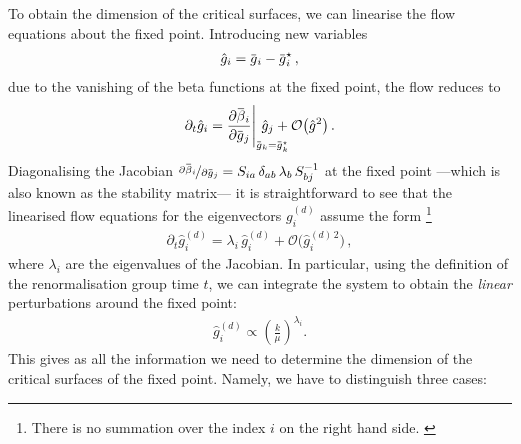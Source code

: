 \documentclass[11pt]{book}
\newcommand{\overbar}[1]{\mkern 1.5mu\overline{\mkern-1.5mu#1\mkern-1.5mu}\mkern 1.5mu}
\numberwithin{equation}{chapter}
\begin{document}
To obtain the dimension of the critical surfaces,
we can linearise the flow equations about
the fixed point. Introducing new variables
\begin{align}
  \hat g_i = \overbar g_i - \overbar g_i^\star \,,
\end{align}
due to the vanishing of the beta functions at
the fixed point, the flow reduces to
\begin{align}
  \partial_t \hat g_i =
  \frac{ \partial \overbar \beta_i }{ \partial \overbar g_j}
  \Bigg|_{ \overbar g_k = \overbar g_k^\star }
  \hspace{-7mm}
  \hat g_j
  + \mathcal O \big( \hat g^2 \big) \,.
\end{align}
Diagonalising the Jacobian
$\nicefrac{ \partial \overbar \beta_i }{ \partial \overbar g_j}
= S_{ia} \, \delta_{ab} \, \lambda_b \, S^{-1}_{bj}$
at the fixed point%
---which is also known as the stability matrix---%
it is straightforward to see that the linearised
flow equations for the eigenvectors
$g_i^{\scriptscriptstyle{(d)}}$
assume the form%
\footnote{
  There is no summation over the index $i$ on the right hand side.
  \label{foot:nosum}
}
\begin{align}
  \partial_t \hat g_i^{\scriptscriptstyle{(d)}} =
  \lambda_i \,
  \hat g_i^{\scriptscriptstyle{(d)}}
  + \mathcal O \big( \hat g_i^{\scriptscriptstyle{(d)} \, 2} \big) \,,
\end{align}
where $\lambda_i$ are the eigenvalues of the Jacobian.
In particular, using the definition of the renormalisation
group time $t$, we can integrate the system to obtain
the \textit{linear} perturbations around the fixed point:
\begin{align}
  \hat g_i^{\scriptscriptstyle{(d)}} \propto \left( \frac{k}{\mu} \right) ^{\lambda_i} .
\end{align}
This gives as all the information we need to determine
the dimension of the critical surfaces of the fixed
point. Namely, we have to distinguish three cases:
\end{document}
